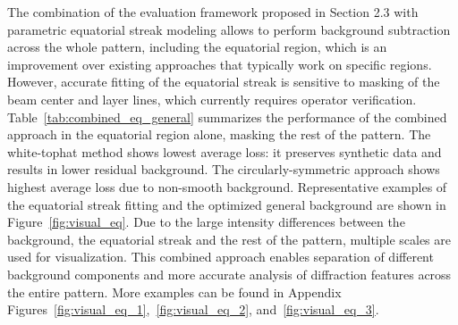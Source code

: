 \documentclass[iucr]{iucrjournals}
\begin{document}
The combination of the evaluation framework proposed in Section 2.3 with parametric equatorial streak modeling allows to perform background subtraction across the whole pattern, including the equatorial region, which is an improvement over existing approaches that typically work on specific regions. However, accurate fitting of the equatorial streak is sensitive to masking of the beam center and layer lines, which currently requires operator verification. Table~\ref{tab:combined_eq_general} summarizes the performance of the combined approach in the equatorial region alone, masking the rest of the pattern. The white-tophat method shows lowest average loss: it preserves synthetic data and results in lower residual background. The circularly-symmetric approach shows highest average loss due to non-smooth background. Representative examples of the equatorial streak fitting and the optimized general background are shown in Figure~\ref{fig:visual_eq}. Due to the large intensity differences between the background, the equatorial streak and the rest of the pattern, multiple scales are used for visualization. This combined approach enables separation of different background components and more accurate analysis of diffraction features across the entire pattern. More examples can be found in Appendix Figures~\ref{fig:visual_eq_1},~\ref{fig:visual_eq_2}, and~\ref{fig:visual_eq_3}.



\end{document}
